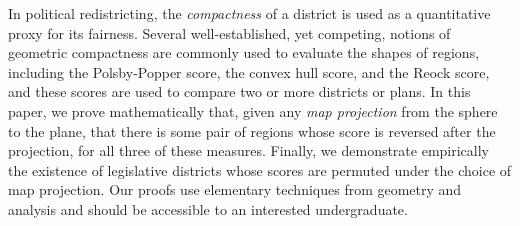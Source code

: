 In political redistricting, the \textit{compactness} of a district is used as a quantitative proxy for its fairness.  Several well-established, yet competing, notions of geometric compactness are commonly used to evaluate the shapes of regions, including the Polsby-Popper score, the convex hull score, and the Reock score, and these scores are used to compare two or more districts or plans.  In this paper, we prove mathematically that, given any \textit{map projection} from the sphere to the plane, that there is some pair of regions whose score is reversed after the projection, for all three of these measures.  Finally, we demonstrate empirically the existence of legislative districts whose scores are permuted under the choice of map projection.  Our proofs use elementary techniques from geometry and analysis and should be accessible to an interested undergraduate.
